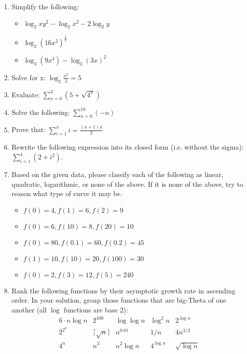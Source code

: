 \documentclass[11pt]{article}
\begin{document}
\begin{enumerate}[leftmargin=*]

\item Simplify the following: 
\begin{itemize}
    \item \( \log_2 xy^2 - \log_2 x^2 - 2 \log_2 y \)
    \item \( \log_2 (16x^2)^\frac{1}{3} \)
    \item \( \log_3(9x^4) - \log_3(3x)^2\)
\end{itemize}

\item Solve for x: \( \log_{2} \frac{x^2}{2} = 5 \)

\item Evaluate: \( \sum\limits_{x=0}^3 (5 + \sqrt{4^x}) \)

\item Solve the following: \( \sum\limits_{n=0}^{10} (-n) \)

\item Prove that: \( \sum\limits_{i=1}^{x} i = \frac{(x + 1)x}{2} \)

\item Rewrite the following expression into its closed form (i.e. without the sigma): \( \sum_{i=1}^4 (2 + i^2) \).

\item Based on the given data, please classify each of the following as linear, quadratic, logarithmic, or none of the above. If it is none of the above, try to reason what type of curve it may be.
\begin{itemize}
    \item $f(0) = 4, f(1) = 6, f(2) = 9$
    \item $f(0) = 6, f(10) = 8, f(20) = 10$
    \item $f(0) = 80, f(0.1) = 60, f(0.2) = 45$
    \item $f(1) = 10, f(10) = 20, f(100) = 30$
    \item $f(0) = 2, f(3) = 12, f(5) = 240$
\end{itemize}

\item Rank the following functions by their asymptotic growth rate in ascending order.  In your solution, group those functions that are big-Theta of one another (all $\log$ functions are base 2):
    \begin{equation*}
        \begin{array}{ccccc}
            6 \cdot n\log n & 2^{100} & \log \log n & \log^2 n & 2^{\log n} \\
            2^{2^n} & \lceil\sqrt{n}\rceil & n^{0.01} & 1/n & 4n^{3/2} \\
            4^n & n^3 & n^2\log n & 4^{\log n} & \sqrt{\log n} \\
        \end{array}
    \end{equation*}


\end{enumerate}
\end{document}
